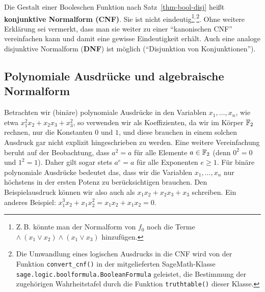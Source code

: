 \begin{refsegment}
Die Gestalt einer Booleschen Funktion nach Satz~\ref{thm-bool-disj}
heißt \textbf{konjunktive Normalform
(CNF)}. Sie ist nicht eindeutig\footnote{%
  Z.\,B. könnte man der Normalform von $f_0$ noch die Terme
  $\wedge\: (x_1 \vee x_2) \wedge (x_1 \vee x_3)$ hinzufügen.
}$^,$\footnote{%
  Die Umwandlung eines logischen Ausdrucks in die CNF wird von der Funktion
  {\tt convert\_cnf()} in der mitgelieferten SageMath-Klasse
  {\tt sage.logic.boolformula.BooleanFormula} geleistet, die
  Bestimmung der zugehörigen Wahrheitstafel durch die Funktion
  {\tt truthtable()} dieser Klasse.
}.
Ohne weitere Erklärung sei vermerkt, dass man sie weiter zu einer "`kanonischen
CNF"' vereinfachen kann und damit eine gewisse Eindeutigkeit erhält.
Auch eine analoge disjunktive Normalform
(\textbf{DNF}) ist möglich ("`Disjunktion von Konjunktionen"').

\subsection{Polynomiale Ausdrücke und algebraische Normalform}\label{ss-bool-anf}

Betrachten wir (binäre) polynomiale
Ausdrücke in den Variablen $x_1, \ldots, x_n$,
wie etwa $x_1^2 x_2 + x_2 x_3 + x_3^2$, so verwenden wir als Koeffizienten,
da wir im Körper $\mathbb{F}_2$ rechnen, nur die Konstanten $0$ und $1$, und diese
brauchen in einem solchen Ausdruck gar nicht explizit hingeschrieben zu werden.
Eine weitere Vereinfachung beruht auf der Beobachtung, dass $a^2 = a$ für alle
Elemente $a \in \mathbb{F}_2$ (denn $0^2 = 0$ und $1^2 = 1$). Daher gilt sogar stets
$a^e = a$ für alle Exponenten $e \geq 1$. Für binäre polynomiale Ausdrücke
bedeutet das, dass wir die Variablen $x_1, \ldots, x_n$ nur höchstens in
der ersten Potenz zu berücksichtigen brauchen. Den Beispielausdruck können
wir also auch als $x_1 x_2 + x_2 x_3 + x_3$ schreiben.
Ein anderes Beispiel: $x_1^3 x_2 + x_1 x_2^2 = x_1 x_2 + x_1 x_2 = 0$.


\end{refsegment}
